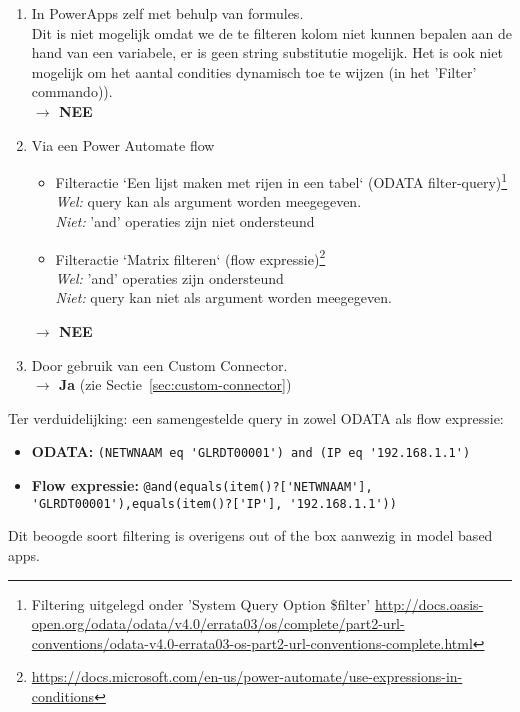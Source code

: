 \begin{enumerate}
    \item In PowerApps zelf met behulp van formules.\\
    Dit is niet mogelijk omdat we de te filteren kolom niet kunnen bepalen aan de hand van een variabele, er is geen string substitutie mogelijk. Het is ook niet mogelijk om het aantal condities dynamisch toe te wijzen (in het 'Filter' commando)).\\
    \textbf{$\rightarrow$ NEE}
    \item Via een Power Automate flow
    \begin{itemize}
        \item Filteractie `Een lijst maken met rijen in een tabel` (ODATA filter-query)\footnote{Filtering uitgelegd onder 'System Query Option \$filter' \url{http://docs.oasis-open.org/odata/odata/v4.0/errata03/os/complete/part2-url-conventions/odata-v4.0-errata03-os-part2-url-conventions-complete.html}}\\ 
            \textit{Wel:}  query kan als argument worden meegegeven.\\
            \textit{Niet:} 'and' operaties zijn niet ondersteund
         \item Filteractie `Matrix filteren` (flow expressie)\footnote{\url{https://docs.microsoft.com/en-us/power-automate/use-expressions-in-conditions}}\\
            \textit{Wel:} 'and' operaties zijn ondersteund\\
            \textit{Niet:} query kan niet als argument worden meegegeven.
    \end{itemize}
    \textbf{$\rightarrow$ NEE}
    \item Door gebruik van een Custom Connector.\\
    \textbf{$\rightarrow$ Ja}
    (zie Sectie~\ref{sec:custom-connector})
\end{enumerate}

Ter verduidelijking: een samengestelde query in zowel ODATA als flow expressie:
\begin{itemize}
    \item \textbf{ODATA:} \lstinline|(NETWNAAM eq 'GLRDT00001') and (IP eq '192.168.1.1')|
    \item \textbf{Flow expressie:} \lstinline|@and(equals(item()?['NETWNAAM'], 'GLRDT00001'),equals(item()?['IP'], '192.168.1.1'))|
\end{itemize}

Dit beoogde soort filtering is overigens out of the box aanwezig in model based apps. \autocite{MicrosoftDocs2020c}

